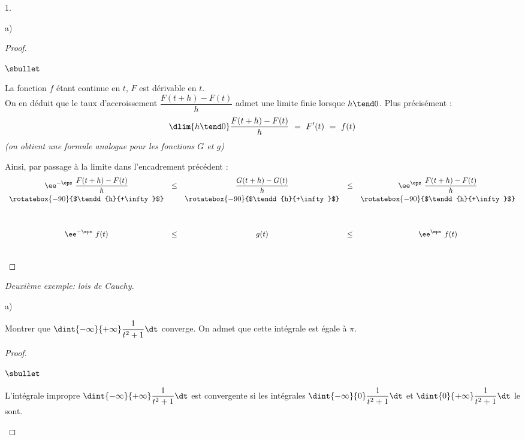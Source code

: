 \documentclass[11pt]{article}%
\begin{document}
\begin{noliste}{1.}
\begin{noliste}{a)}
\begin{proof}
\begin{noliste}{$\sbullet$}
      \item La fonction $f$ étant continue en $t$, $F$ est
        dérivable en $t$.\\[.1cm]
        On en déduit que le taux d'accroissement $\dfrac{F(t+h) -
          F(t)}{h}$ admet une limite finie lorsque $h \tend 0$. Plus
        précisément :
        \[
        \dlim{h \tend 0} \dfrac{F(t+h) - F(t)}{h} \ = \ F'(t) \ = \
        f(t)
        \]
        {\it (on obtient une formule analogue pour les fonctions $G$
          et $g$)}
          
          
          \newpage
          
          
        Ainsi, par passage à la limite dans l'encadrement précédent :
        \[
        \begin{array}{ccccc}
          \ee^{-\eps} \ \dfrac{F(t+h) - F(t)}{h} & \leq & \dfrac{G(t+h)
            - G(t)}{h} & \leq & \ee^{\eps} \ \dfrac{F(t+h) - F(t)}{h}
          \\[.2cm]
          \rotatebox{-90}{$\tendd{h}{+\infty}$} & &
          \rotatebox{-90}{$\tendd{h}{+\infty}$} & &
          \rotatebox{-90}{$\tendd{h}{+\infty}$} 
          \\[1.2cm]
          \ee^{-\eps} \ f(t) & \leq & g(t) & \leq & \ee^{\eps} \ f(t)
        \end{array}
        \]        
      \end{noliste}
      ~\\[-1.2cm]
    \end{proof}

  \end{noliste}
  
\item {\em Deuxième exemple: lois de Cauchy.}
  \begin{noliste}{a)}
    \setlength{\itemsep}{2mm} %
  \item Montrer que $\dint{-\infty}{+\infty} \dfrac{1}{t^2+1} \dt$
    converge. On admet que cette intégrale est égale à $\pi$.

    \begin{proof}~%
      \begin{noliste}{$\sbullet$}
      \item L'intégrale impropre $\dint{-\infty}{+\infty}
        \dfrac{1}{t^2+1} \dt$ est convergente si les intégrales
        $\dint{-\infty}{0} \dfrac{1}{t^2+1} \dt$ et $\dint{0}{+\infty}
        \dfrac{1}{t^2+1} \dt$ le sont.


\end{noliste}
\end{proof}
\end{noliste}
\end{noliste}
\end{document}
